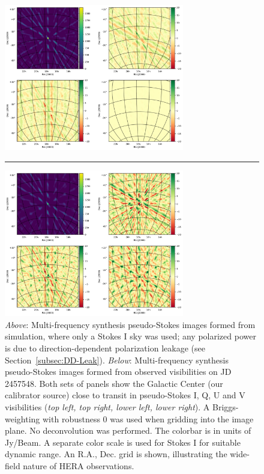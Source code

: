 \documentclass[twocolumn, trackchanges]{aastex61}
\begin{document}
\begin{figure}
\centering
\includegraphics[width=0.7\textwidth]{sim4pol_new.pdf}
\vspace{-0.1in}
\par\noindent\rule{0.8\textwidth}{0.4pt}
\includegraphics[width=0.7\textwidth]
{real4pol_new.pdf}
\caption{
\textit{Above}: Multi-frequency synthesis pseudo-Stokes images formed from simulation, where only a Stokes I sky was used; any polarized power is due to direction-dependent polarization leakage (see Section~\ref{subsec:DD-Leak}).
\textit{Below}: Multi-frequency synthesis pseudo-Stokes images formed from observed visibilities on JD 2457548.
Both sets of panels show the Galactic Center (our calibrator source) close to transit in pseudo-Stokes I, Q, U and V visibilities (\textit{top left, top right, lower left, lower right}). A Briggs-weighting with robustness 0 was used when gridding into the image plane. 
	No deconvolution was performed. 
	The colorbar is in units of Jy/Beam.
A separate color scale is used for Stokes I for suitable dynamic range. An R.A., Dec. grid is shown, illustrating the wide-field nature of HERA observations.
}
\label{fig:GCimage}
\end{figure}
\end{document}
